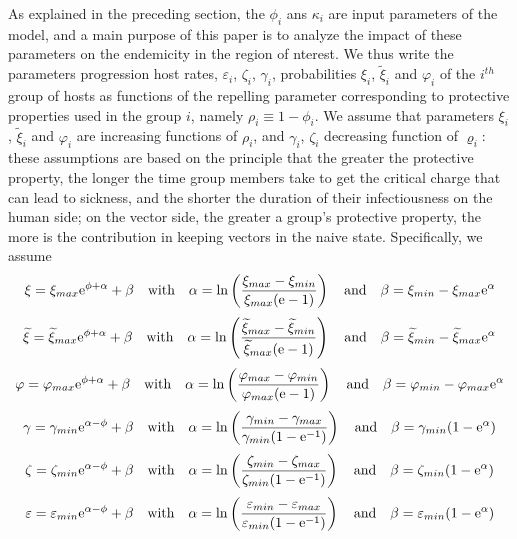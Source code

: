 \documentclass[a4paper]{article}
\newcommand{\miVar}{\varphi_i}
\begin{document}
\noindent As explained in the preceding section, the $\phi_i$ ans $\kappa_i$ are input parameters of the model, and a main purpose of this paper is to analyze the impact of these parameters on the endemicity in the region of nterest. We thus write the parameters progression host rates, $\varepsilon_i$, $\zeta_i$, $\gamma_i$, probabilities $\xi_i$, $\widetilde\xi_i$ and $\miVar$ of the $i^{th}$ group of hosts as functions of the repelling parameter corresponding to protective properties used in the group $i$, namely $\rho_i\equiv1-\phi_i$. We assume that parameters  $\xi_i$, $\widetilde\xi_i$ and $\miVar$ are increasing functions of $\rho_i$, and $\gamma_i$, $\zeta_i$ decreasing function of $\varrho_i$: these assumptions are based on the principle that the greater the protective  property, the longer the time group members take to get the critical charge that can lead to sickness, and the shorter the duration of their infectiousness on the human side; on the vector side, the greater a group's protective property, the more is the contribution in keeping vectors in the naive state. Specifically, we assume 
$$\xi = \xi_{max}\mathrm e^{\phi+\alpha}+\beta~~\hbox{ with }~~\alpha=\ln\left(\frac{\xi_{max}-\xi_{min}}{\xi_{max}(\mathrm e-1)}\right)~~\hbox{ and }~~ \beta = \xi_{min}-\xi_{max}\mathrm e^\alpha$$ 
$$\widetilde\xi = \widetilde\xi_{max}\mathrm e^{\phi+\alpha}+\beta~~\hbox{ with }~~\alpha=\ln\left(\frac{\widetilde\xi_{max}-\widetilde\xi_{min}}{\widetilde\xi_{max}(\mathrm e-1)}\right)~~\hbox{ and }~~ \beta = \widetilde\xi_{min}-\widetilde\xi_{max}\mathrm e^\alpha$$
$$\varphi = \varphi_{max}\mathrm e^{\phi+\alpha}+\beta~~\hbox{ with }~~\alpha=\ln\left(\frac{\varphi_{max}-\varphi_{min}}{\varphi_{max}(\mathrm e-1)}\right)~~\hbox{ and }~~ \beta = \varphi_{min}-\varphi_{max}\mathrm e^\alpha$$ $$\gamma = \gamma_{min}\mathrm e^{\alpha-\phi}+\beta~~\hbox{ with }~~\alpha=\ln\left(\frac{\gamma_{min}-\gamma_{max}}{\gamma_{min}(1-\mathrm e^{-1})}\right)~~\hbox{ and }~~ \beta = \gamma_{min}(1-\mathrm e^\alpha)$$ 
$$\zeta = \zeta_{min}\mathrm e^{\alpha-\phi}+\beta~~\hbox{ with }~~\alpha=\ln\left(\frac{\zeta_{min}-\zeta_{max}}{\zeta_{min}(1-\mathrm e^{-1})}\right)~~\hbox{ and }~~ \beta = \zeta_{min}(1-\mathrm e^\alpha)$$ 
$$\varepsilon = \varepsilon_{min}\mathrm e^{\alpha-\phi}+\beta~~\hbox{ with }~~\alpha=\ln\left(\frac{\varepsilon_{min}-\varepsilon_{max}}{\varepsilon_{min}(1-\mathrm e^{-1})}\right)~~\hbox{ and }~~ \beta = \varepsilon_{min}(1-\mathrm e^\alpha)$$
\end{document}
